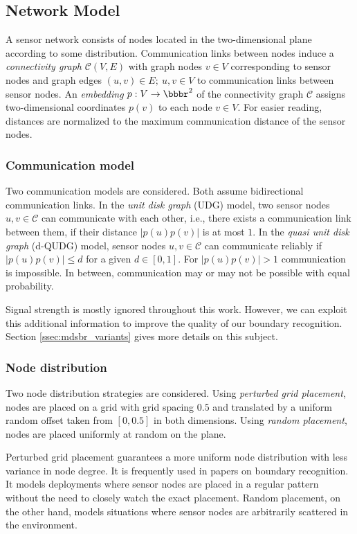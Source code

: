 \documentclass{llncs}
\newcommand{\cC}{\mathcal C}
\begin{document}
\subsection{Network Model}\label{sec:network_model}
A sensor network consists of nodes located in the two-dimensional plane according to some distribution.
Communication links between nodes induce a \emph{connectivity graph} $\cC(V, E)$ with graph nodes $v \in V$ corresponding to sensor nodes and graph edges $(u, v) \in E;\ u, v \in V$ to communication links between sensor nodes.
An \emph{embedding} $p: V \rightarrow \bbbr^2$ of the connectivity graph $\cC$ assigns two-dimensional coordinates $p(v)$ to each node $v \in V$.
For easier reading, distances are normalized to the maximum communication distance of the sensor nodes.

\subsubsection{Communication model}
Two communication models are considered.
Both assume bidirectional communication links.
In the \emph{unit disk graph} (UDG) model, two sensor nodes $u, v \in \cC$ can communicate with each other, i.e., there exists a communication link between them, if their distance $|p(u)p(v)|$ is at most $1$.
In the \emph{quasi unit disk graph} (d-QUDG) model, sensor nodes $u, v \in \cC$ can communicate reliably if $|p(u)p(v)| \leq d$ for a given $d \in [0,1]$.
For $|p(u)p(v)| > 1$ communication is impossible.
In between, communication may or may not be possible with equal probability.

Signal strength is mostly ignored throughout this work.
However, we can exploit this additional information to improve the quality of our boundary recognition.
Section \ref{ssec:mdsbr_variants} gives more details on this subject.

\subsubsection{Node distribution}
Two node distribution strategies are considered.
Using \emph{perturbed grid placement}, nodes are placed on a grid with grid spacing $0.5$ and translated by a uniform random offset taken from $[0, 0.5]$ in both dimensions.
Using \emph{random placement}, nodes are placed uniformly at random on the plane.

Perturbed grid placement guarantees a more uniform node distribution with less variance in node degree.
It is frequently used in papers on boundary recognition.
It models deployments where sensor nodes are placed in a regular pattern without the need to closely watch the exact placement.
Random placement, on the other hand, models situations where sensor nodes are arbitrarily scattered in the environment.
\end{document}
